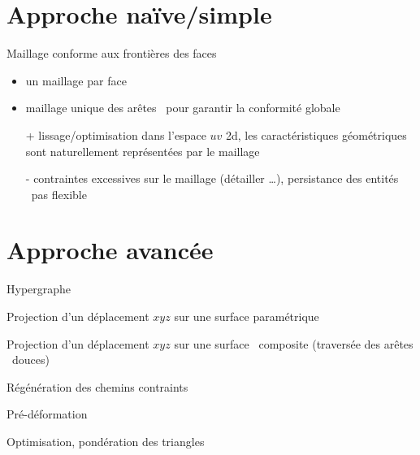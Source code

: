 \section{Approche naïve/simple}
Maillage conforme aux frontières des faces \brep\ \cite{andrieu2017}
\begin{itemize}
	\item un maillage par face \brep
	\item maillage unique des arêtes \brep\ pour garantir la conformité globale
	\item[+] lissage/optimisation dans l'espace $uv$ 2d, les caractéristiques géométriques sont naturellement représentées par le maillage
	\item[-] contraintes excessives sur le maillage (détailler \ldots), persistance des entités \brep\  pas flexible
\end{itemize}

\section{Approche avancée}
Hypergraphe\par
Projection d'un déplacement $xyz$ sur une surface paramétrique\par
Projection d'un déplacement $xyz$ sur une surface \brep\ composite (traversée des arêtes \brep\ douces)\par
Régénération des chemins contraints\par
Pré-déformation\par
Optimisation, pondération des triangles



